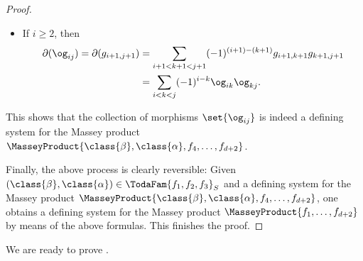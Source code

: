 \documentclass[a4paper]{amsart}
\begin{document}
\begin{proof}
\begin{itemize}
\begin{align*}
\begin{pmatrix}
                            \end{pmatrix}                                  \\
                         & =\begin{pmatrix}
                              \sum_{2<\ell<j+1}(-1)^{2-\ell}g_{2\ell}g_{\ell,j+1} \\
                              -\sum_{2<\ell<j+1}(-1)^{1-\ell}g_{1\ell}g_{\ell,j+1}
                            \end{pmatrix}                                         \\
                         & =\sum_{2<\ell<j+1}(-1)^{2-\ell}\begin{pmatrix}g_{2\ell} \\g_{1\ell}\end{pmatrix}g_{\ell,j+1} \\
                         & =\sum_{2<\ell<j+1}(-1)^{2-\ell}\og_{1,\ell-1}\og_{\ell-1,j}                                  \\
                         & =\sum_{1<k<j}(-1)^{1-k}\og_{1k}\og_{kj}.
    \end{align*}
  \item If $i\geq2$, then
    \begin{align*}
      \partial(\og_{ij})=\partial(g_{i+1,j+1}) & =\sum_{i+1<k+1<j+1}(-1)^{(i+1)-(k+1)}g_{i+1,k+1}g_{k+1,j+1}
      \\ & =\sum_{i<k<j}(-1)^{i-k}\og_{ik}\og_{kj}.
    \end{align*}
  \end{itemize}
  This shows that the collection of morphisms $\set{\og_{ij}}$ is indeed a
  defining system for the Massey product
  $\MasseyProduct{\class{\beta},\class{\alpha},f_4,\dots,f_{d+2}}$.

  Finally, the above process is clearly reversible: Given
  $(\class{\beta},\class{\alpha})\in\TodaFam{f_1,f_2,f_3}_S$ and a defining
  system for the Massey product
  $\MasseyProduct{\class{\beta},\class{\alpha},f_4,\dots,f_{d+2}}$, one obtains
  a defining system for the Massey product $\MasseyProduct{f_1,\dots,f_{d+2}}$
  by means of the above formulas. This finishes the proof.
\end{proof}

We are ready to prove .
\end{document}
